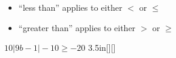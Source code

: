 \begin{tcolorbox}[center,width=3.5in,]
    \begin{itemize}[fullwidth]
        \item ``less than'' applies to either {\Large$<$} or {\Large$\le$}
        \item ``greater than'' applies to either {\Large$>$} or {\Large$\ge$}
    \end{itemize}
\end{tcolorbox}


{
    $10|9b-1| -10 \ge -20$
}{3.5in}[\raggedleft{}][\raggedleft{}]

